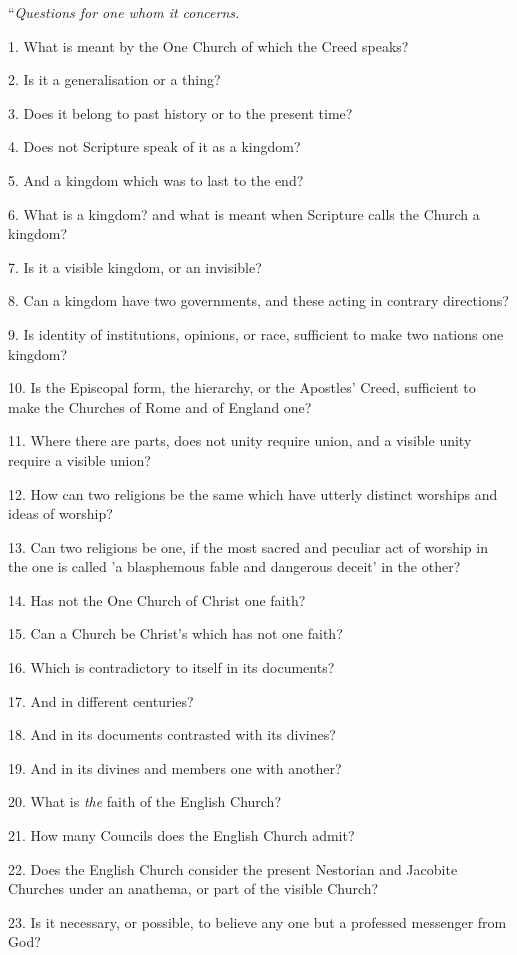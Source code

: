 ``\emph{Questions for one whom it concerns.}

1. What is meant by the One Church of which the Creed speaks?

2. Is it a generalisation or a thing?

3. Does it belong to past history or to the present time?

4. Does not Scripture speak of it as a kingdom?

5. And a kingdom which was to last to the end?

6. What is a kingdom? and what is meant when Scripture calls the
Church a kingdom?

7. Is it a visible kingdom, or an invisible?

8. Can a kingdom have two governments, and these acting in contrary
directions?

9. Is identity of institutions, opinions, or race, sufficient to
make two nations one kingdom?

10. Is the Episcopal form, the hierarchy, or the Apostles' Creed,
sufficient to make the Churches of Rome and of England one?

11. Where there are parts, does not unity require union, and a
visible unity require a visible union?

12. How can two religions be the same which have utterly
distinct worships and ideas of worship?

13. Can two religions be one, if the most sacred and peculiar act
of worship in the one is called 'a blasphemous fable and dangerous
deceit' in the other?

14. Has not the One Church of Christ one faith?

15. Can a Church be Christ's which has not one faith?

16. Which is contradictory to itself in its documents?

17. And in different centuries?

18. And in its documents contrasted with its divines?

19. And in its divines and members one with another?

20. What is \emph{the} faith of the English Church?

21. How many Councils does the English Church admit?

22. Does the English Church consider the present Nestorian and
Jacobite Churches under an anathema, or part of the visible Church?

23. Is it necessary, or possible, to believe any one but a
professed messenger from God?

